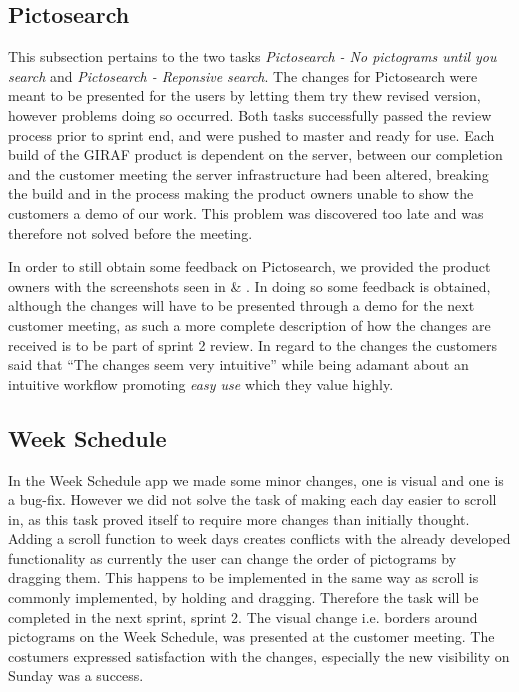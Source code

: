 \subsection{Pictosearch}
This subsection pertains to the two tasks \textit{Pictosearch - No pictograms until you search} and \textit{Pictosearch - Reponsive search}.
The changes for Pictosearch were meant to be presented for the users by letting them try thew revised version, however problems doing so occurred.
Both tasks successfully passed the review process prior to sprint end, and were pushed to master and ready for use.
Each build of the GIRAF product is dependent on the server, between our completion and the customer meeting the server infrastructure had been altered, breaking the build and in the process making the product owners unable to show the customers a demo of our work.
This problem was discovered too late and was therefore not solved before the meeting.

In order to still obtain some feedback on Pictosearch, we provided the product owners with the screenshots seen in  \& .
In doing so some feedback is obtained, although the changes will have to be presented through a demo for the next customer meeting, as such a more complete description of how the changes are received is to be part of sprint 2 review.
In regard to the changes the customers said that \enquote{The changes seem very intuitive} while being adamant about an intuitive workflow promoting \textit{easy use} which they value highly.

\subsection{Week Schedule}
In the Week Schedule app we made some minor changes, one is visual and one is a bug-fix.
However we did not solve the task of making each day easier to scroll in, as this task proved itself to require more changes than initially thought.
Adding a scroll function to week days creates conflicts with the already developed functionality as currently the user can change the order of pictograms by dragging them.
This happens to be implemented in the same way as scroll is commonly implemented, by holding and dragging.
Therefore the task will be completed in the next sprint, sprint 2.
The visual change i.e. borders around pictograms on the Week Schedule, was presented at the customer meeting.
The costumers expressed satisfaction with the changes, especially the new visibility on Sunday was a success.
